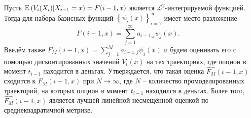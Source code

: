 \begin{theorem}
    Пусть $\mathrm{E}\left(V_i(X_i)\middle\vert X_{i-1} = x\right) = F(i-1, x)$ является $\mathcal L^2$-интегрируемой функцией. Тогда для набора базисных функций $\left\{\psi_i(x)\right\}_{i=1}^{\infty}$ имеет место разложение $$F(i-1, x) = \sum_{j=1}^\infty a_{i-1,j} \psi_j(x).$$
    Введём также $F_M(i-1, x) = \sum_{j=1}^M a_{i-1,j} \psi_j(x)$ и будем оценивать его с помощью дисконтированных значений $V_i\left(x\right)$ на тех траекториях, где опцион в момент $t_{i-1}$ находится в деньгах. Утверждается, что такая оценка $\widehat{F_M}(i-1, x)$ сходится к $F_M(i-1, x)$ при $N\to\infty$, где $N$ -- количество промоделированных траекторий, на которых опцион в момент $t_{i-1}$ находился в деньгах. Более того, $\widehat{F_M}(i-1, x)$ является лучшей линейной несмещённой оценкой по среднеквадратичной метрике.
\end{theorem}


